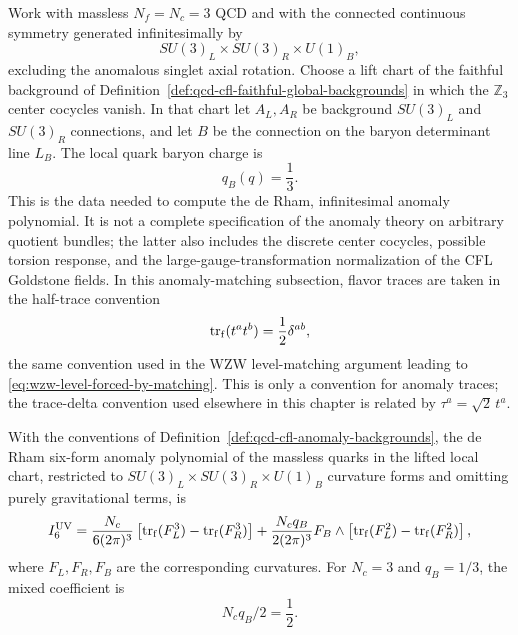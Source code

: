 \begin{definition}
\label{def:qcd-cfl-anomaly-backgrounds}
Work with massless \(N_f=N_c=3\) QCD and with the connected continuous
symmetry generated infinitesimally by
\[
  SU(3)_L\times SU(3)_R\times U(1)_B ,
\]
excluding the anomalous singlet axial rotation.  Choose a lift chart of the
faithful background of
Definition~\ref{def:qcd-cfl-faithful-global-backgrounds} in which the
\(\mathbb Z_3\) center cocycles vanish.  In that chart let \(A_L,A_R\) be
background \(SU(3)_L\) and \(SU(3)_R\) connections, and let \(B\) be the
connection on the baryon determinant line \(L_B\).  The local quark baryon
charge is
\[
  q_B(q)=\frac13 .
\]
This is the data needed to compute the de Rham, infinitesimal anomaly
polynomial.  It is not a complete specification of the anomaly theory on
arbitrary quotient bundles; the latter also includes the discrete center
cocycles, possible torsion response, and the large-gauge-transformation
normalization of the CFL Goldstone fields.
In this anomaly-matching subsection, flavor traces are taken in the
half-trace convention
\[
  \operatorname{tr}_{\rm f}(t^at^b)=\frac12\delta^{ab},
\]
the same convention used in the WZW level-matching argument leading to
\eqref{eq:wzw-level-forced-by-matching}.  This is only a convention for
anomaly traces; the trace-delta convention used elsewhere in this chapter is
related by \(\tau^a=\sqrt2\,t^a\).
\end{definition}

\begin{lemma}
\label{lem:qcd-cfl-uv-anomaly-polynomial}
With the conventions of
Definition~\ref{def:qcd-cfl-anomaly-backgrounds}, the de Rham six-form
anomaly polynomial of the massless quarks in the lifted local chart, restricted
to \(SU(3)_L\times SU(3)_R\times U(1)_B\) curvature forms and omitting purely
gravitational terms, is
\begin{equation}
  I_6^{\rm UV}
  =
  \frac{N_c}{6(2\pi)^3}
  \left[
    \operatorname{tr}_{\rm f}(F_L^3)
    -
    \operatorname{tr}_{\rm f}(F_R^3)
  \right]
  +
  \frac{N_c q_B}{2(2\pi)^3}
  F_B\wedge
  \left[
    \operatorname{tr}_{\rm f}(F_L^2)
    -
    \operatorname{tr}_{\rm f}(F_R^2)
  \right],
  \label{eq:qcd-cfl-uv-anomaly-polynomial-general}
\end{equation}
where \(F_L,F_R,F_B\) are the corresponding curvatures.  For
\(N_c=3\) and \(q_B=1/3\), the mixed coefficient is
\begin{equation}
  N_cq_B/2=\frac12.
  \label{eq:qcd-cfl-mixed-anomaly-coefficient}
\end{equation}
\end{lemma}

